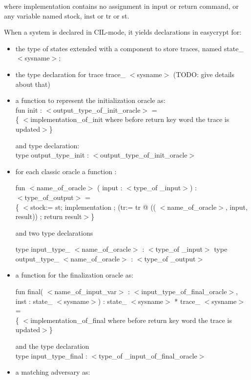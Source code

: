 \documentclass[11pt]{article}
\renewcommand{\textit}[1]{ $<$#1$>$}
\begin{document}
where implementation contains no assignment in input or return command,
or any variable named stock, inst or tr or st. 

When a system is declared in CIL-mode, it yields declarations in easycrypt
for:

\begin{itemize}
\item the type of states extended with a component
to store traces, named state\_\textit{sysname};
\item the type declaration for trace trace\_\textit{sysname} (TODO: give details about that)
\item a function to represent the initialization oracle as:\\
 
fun init : \textit{output\_type\_of\_init\_oracle} =\\
\{\textit{implementation\_of\_init where before return key word the trace is updated}\}

and type declaration:\\

type output\_type\_init : \textit{output\_type\_of\_init\_oracle}
\item for each classic oracle a function : 

 fun \textit{name\_of\_oracle} ( input : 
\textit{type\_of \_input}) : \\ \textit{type\_of\_output}  = \\
\{\textit{stock:= st; implementation ; (tr:= tr @ ((\textit{name\_of\_oracle}, input, result)) ; return result}\}

and two type declarations 

type input\_type\_\textit{name\_of\_oracle} : \textit{type\_of \_input}
type output\_type\_\textit{name\_of\_oracle} : \textit{type\_of \_output}
\item a function for the finalization oracle as: 

fun final( \textit{name\_of\_input\_var} :
\textit{input\_type\_of\_final\_oracle},
inst : state\_\textit{sysname}) : state\_\textit{sysname} * trace\_\textit{sysname}  =\\
\{\textit{implementation\_of\_final where before return key word the trace is updated}\}

and the type declaration\\
type input\_type\_final : \textit{type\_of \_input\_of\_final\_oracle}

\item a matching adversary as:


\end{itemize}
\end{document}
